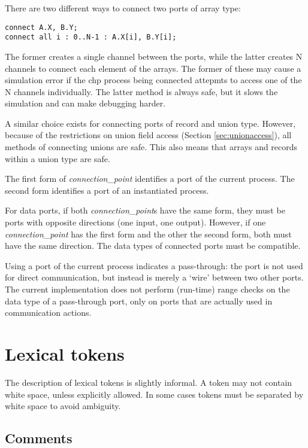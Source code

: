There are two different ways to connect two ports of array type:
\begin{verbatim}
connect A.X, B.Y;
connect all i : 0..N-1 : A.X[i], B.Y[i];
\end{verbatim}
The former creates a single channel between the ports, while the latter
creates N channels to connect each element of the arrays.  The former of
these may cause a simulation error if the chp process being connected
attepmts to access one of the N channels individually.
The latter method is always safe, but it
slows the simulation and can make debugging harder.

A similar choice exists for connecting ports of record and union type.
However, because of the restrictions on union field access (Section \ref{sec:unionaccess}),
all methods of connecting unions are safe.  This also means that arrays and
records within a union type are safe.

The first form of {\it{}connection\_point} identifies a port of the current
process. The second form identifies a port of an instantiated process.

For data ports, if both {\it{}connection\_point}s have the same form, they
must be ports with opposite directions (one input, one output). However,
if one {\it{}connection\_point} has the first form and the other the
second form, both must have the same direction. The data types of
connected ports must be compatible.

Using a port of the current process indicates a pass-through: the port
is not used for direct communication, but instead is merely a `wire' between
two other ports. The current implementation does not perform (run-time)
range checks on the data type of a pass-through port, only on ports that
are actually used in communication actions.


\section{Lexical tokens}\label{sec:lexical}

The description of lexical tokens is slightly informal. A token may not
contain white space, unless explicitly allowed. In some cases tokens
must be separated by white space to avoid ambiguity.


\subsection{Comments}\label{sec:comments}

